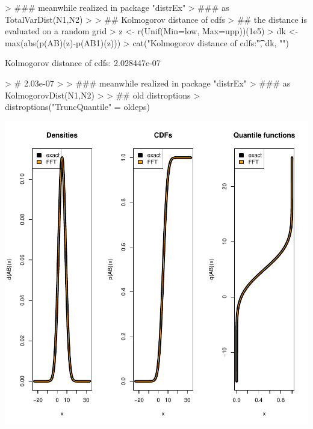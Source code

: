 \documentclass[11pt]{article}
\begin{document}
\begin{Schunk}
\begin{Soutput}
\end{Soutput}
\begin{Sinput}
> ### meanwhile realized in package "distrEx" 
> ### as TotalVarDist(N1,N2)
> 
> ## Kolmogorov distance of cdfs 
> ## the distance is evaluated on a random grid
> z <- r(Unif(Min=low, Max=upp))(1e5)
> dk <- max(abs(p(AB)(z)-p(AB1)(z)))
> cat("Kolmogorov distance of cdfs:\t", dk, "\n") 
\end{Sinput}
\begin{Soutput}
Kolmogorov distance of cdfs:	 2.028447e-07 
\end{Soutput}
\begin{Sinput}
> # 2.03e-07
> 
> ### meanwhile realized in package "distrEx" 
> ### as KolmogorovDist(N1,N2)
> 
> ## old distroptions
> distroptions("TruncQuantile" = oldeps)
\end{Sinput}
\end{Schunk}
\includegraphics{distr-ConvolutionNormalDistr}
\end{document}

